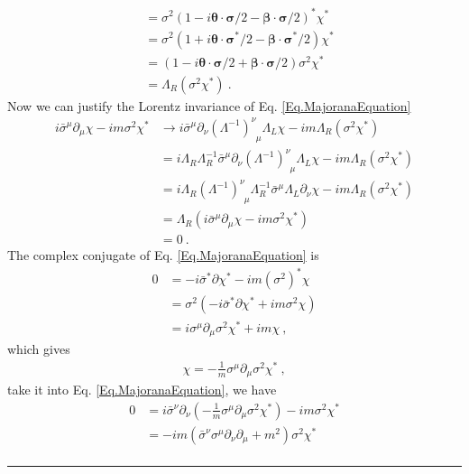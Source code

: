 \documentclass[12pt]{report}
\numberwithin{problemname}{chapter}
\newenvironment{solution}{\vspace{1em}\par\noindent{\large\textbf{\textsc{Solution}}}\par}{\vspace{1em}\hrule}
\begin{document}
\begin{solution}
\begin{enumerate}[(a)]
\begin{align}
        &=\sigma^2(1-i\bm{\theta}\cdot\bm{\sigma}/2-\bm{\beta}\cdot\bm{\sigma}/2)^*\chi^* \nonumber \\
        &=\sigma^2(1+i\bm{\theta}\cdot\bm{\sigma}^*/2-\bm{\beta}\cdot\bm{\sigma}^*/2)\chi^* \nonumber \\
        &=(1-i\bm{\theta}\cdot\bm{\sigma}/2+\bm{\beta}\cdot\bm{\sigma}/2)\sigma^2\chi^* \nonumber \\
        &=\Lambda_{R}(\sigma^2\chi^*)\ .
    \end{align}
    Now we can justify the Lorentz invariance of Eq. \eqref{Eq.MajoranaEquation}
    \begin{align}
        i\bar{\sigma}^{\mu}\partial_{\mu}\chi-im\sigma^2\chi^*&\rightarrow i\bar{\sigma}^{\mu}\partial_{\nu}(\Lambda^{-1})^{\nu}_{\enspace\mu}\Lambda_{L}\chi-im\Lambda_{R}(\sigma^2\chi^*) \nonumber \\
        &=i\Lambda_{R}\Lambda^{-1}_{R}\bar{\sigma}^{\mu}\partial_{\nu}(\Lambda^{-1})^{\nu}_{\enspace\mu}\Lambda_{L}\chi-im\Lambda_{R}(\sigma^2\chi^*) \nonumber \\
        &=i\Lambda_{R}(\Lambda^{-1})^{\nu}_{\enspace\mu}\Lambda^{-1}_{R}\bar{\sigma}^{\mu}\Lambda_{L}\partial_{\nu}\chi-im\Lambda_{R}(\sigma^2\chi^*) \nonumber \\
        &=\Lambda_{R}(i\bar{\sigma}^{\mu}\partial_{\mu}\chi-im\sigma^2\chi^*) \nonumber \\
        &=0\ .
    \end{align}
    The complex conjugate of Eq. \eqref{Eq.MajoranaEquation} is
    \begin{align}
        0&=-i\bar{\sigma}^*\partial\chi^*-im(\sigma^2)^*\chi \nonumber \\
        &=\sigma^2(-i\bar{\sigma}^*\partial\chi^*+im\sigma^2\chi) \nonumber \\
        &=i\sigma^{\mu}\partial_{\mu}\sigma^2\chi^*+im\chi\ ,
    \end{align}
    which gives
    \begin{align}
        \chi=-\frac{1}{m}\sigma^{\mu}\partial_{\mu}\sigma^2\chi^*\ ,
    \end{align}
    take it into Eq. \eqref{Eq.MajoranaEquation}, we have
    \begin{align}
        0&=i\bar{\sigma}^{\nu}\partial_{\nu}(-\frac{1}{m}\sigma^{\mu}\partial_{\mu}\sigma^2\chi^*)-im\sigma^2\chi^* \nonumber \\
        &=-im(\bar{\sigma}^{\nu}\sigma^{\mu}\partial_{\nu}\partial_{\mu}+m^2)\sigma^2\chi^* \nonumber \\

\end{align}
\end{enumerate}
\end{solution}
\end{document}
